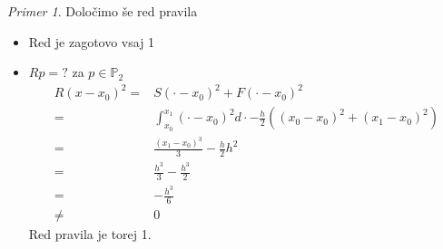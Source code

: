 \documentclass[a4paper,12pt]{article}
\theoremstyle{definition}
\theoremstyle{remark}
\newtheorem*{ex}{Primer}
\newcommand{\Pp}{\mathbb{P}}
\begin{document}
\begin{ex}
    Določimo še red pravila
    \begin{itemize}
        \item Red je zagotovo vsaj 1
        \item $Rp=?$ za $p\in \Pp_2$
        \begin{align*}
            R(x - x_0)^2 =& S(\cdot - x_0)^2 + F(\cdot - x_0)^2 \\
                         =& \int_{x_0}^{x_1} (\cdot - x_0)^2 d\cdot - \frac{h}{2}((x_0 - x_0)^2 + (x_1 - x_0)^2) \\
                         =& \frac{(x_1 - x_0)^3}{3} - \frac{h}{2} h^2 \\
                         =& \frac{h^3}{3} - \frac{h^3}{2} \\
                         =& - \frac{h^3}{6} \\
                         \neq& 0
        \end{align*}
        Red pravila je torej 1.
    \end{itemize}
\end{ex}
\end{document}
